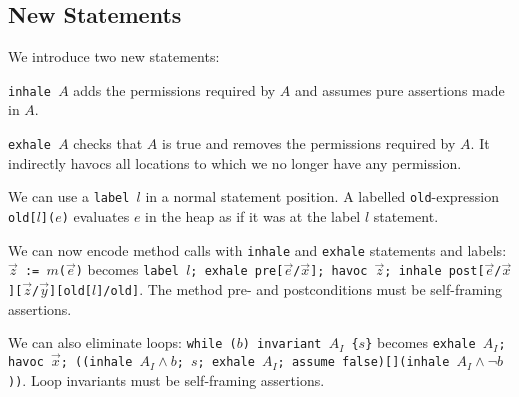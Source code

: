 \subsection{New Statements}
\begin{mytitle} We introduce two new statements:
    \begin{mysubtitle} \texttt{inhale $A$} adds the permissions required by $A$ and assumes pure assertions made in $A$.
    \end{mysubtitle}
    \begin{mysubtitle} \texttt{exhale $A$} checks that $A$ is true and removes the permissions required by $A$. It indirectly havocs all locations to which we no longer have any permission.
    \end{mysubtitle}
\end{mytitle}
\begin{mytitle} We can use a \texttt{label $l$} in a normal statement position. A labelled \texttt{old}-expression \texttt{old[$l$]($e$)} evaluates $e$ in the heap as if it was at the label $l$ statement.
\end{mytitle}
\begin{mytitle} We can now encode method calls with \texttt{inhale} and \texttt{exhale} statements and labels: \texttt{$\vec{z}$ := $m$($\vec{e}$)} becomes \texttt{label $l$; exhale pre[$\vec{e}$/$\vec{x}$]; havoc $\vec{z}$; inhale post[$\vec{e}$/$\vec{x}$][$\vec{z}$/$\vec{y}$][old[$l$]/old]}. The method pre- and postconditions must be self-framing assertions.
\end{mytitle}
\begin{mytitle} We can also eliminate loops: \texttt{while ($b$) invariant $A_I$ \{$s$\}} becomes \texttt{exhale $A_I$; havoc $\vec{x}$; ((inhale $A_I\land b$; $s$; exhale $A_I$; assume false)[](inhale $A_I\land \lnot b$))}. Loop invariants must be self-framing assertions.
\end{mytitle}